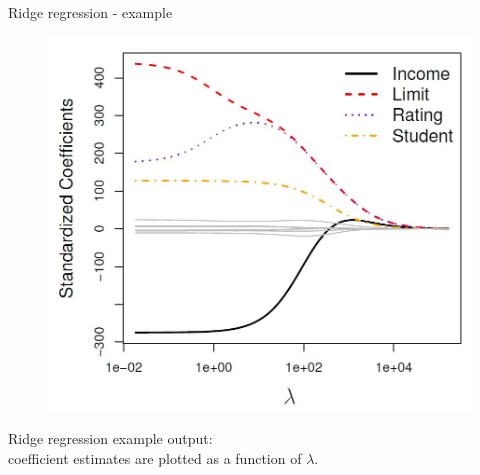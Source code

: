 \documentclass{beamer}
\begin{document}
\begin{frame}{Ridge regression - example}
\vspace{-1cm}
\begin{figure}
\includegraphics[scale=0.30]{IMG/Ridge.jpg}
\end{figure}
\vspace{-0.5cm}
\centering Ridge regression example output: \\coefficient estimates are plotted as a function of $\lambda$.
\end{frame}
\end{document}
